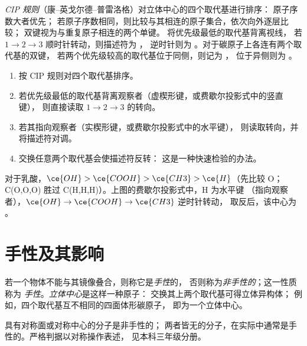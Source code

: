 \begin{definition}\label{def:b1:stereochemistry-in-depth:cip}
\emph{CIP 规则}（康–英戈尔德–普雷洛格）对立体中心的四个取代基进行排序：
原子序数大者优先；
若原子序数相同，则比较与其相连的原子集合，依次向外逐层比较；
双键视为与重复原子相连的两个单键。
将优先级最低的取代基背离视线，
若 $1 \to 2 \to 3$ 顺时针转动，则描述符为 ，
逆时针则为 。对于碳原子上各连有两个取代基的双键，
若两个优先级较高的取代基位于同侧，则记为 ，
位于异侧则为 。
\end{definition}

\begin{method}\label{met:b1:stereochemistry-in-depth:cip}
\begin{enumerate}
  \item 按 CIP 规则对四个取代基排序。
  \item 若优先级最低的取代基背离观察者（虚楔形键，或费歇尔投影式中的竖直键），
        则直接读取
        $1 \to 2 \to 3$ 的转向。
  \item 若其指向观察者（实楔形键，或费歇尔投影式中的水平键），
        则读取转向，并将描述符对调。
  \item 交换任意两个取代基会使描述符反转：
        这是一种快速检验的办法。
\end{enumerate}
对于乳酸，$\ce{OH} > \ce{COOH} > \ce{CH3} > \ce{H}$（先比较 O；
C(O,O,O) 胜过 C(H,H,H)）。上图的费歇尔投影式中，H 为水平键
（指向观察者），$\ce{OH} \to \ce{COOH} \to \ce{CH3}$ 逆时针转动，
取反后，该中心为 。
\end{method}

\section{手性及其影响}

\begin{definition}[立体中心，手性]\label{def:b1:stereochemistry-in-depth:stereocentre}
若一个物体不能与其镜像叠合，则称它是\emph{手性}的，
否则称为\emph{非手性的}；这一性质称为
\emph{手性}。\emph{立体中心}是这样一种原子：
交换其上两个取代基可得立体异构体；
例如，四个取代基互不相同的四面体形碳原子，
即为一个立体中心。
\end{definition}

具有对称面或对称中心的分子是非手性的；
两者皆无的分子，在实际中通常是手性的。严格判据以对称操作表述，
见本科三年级分册。

